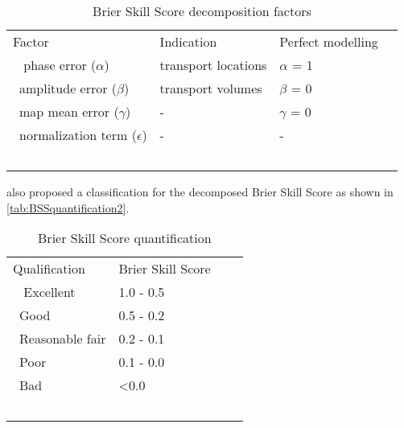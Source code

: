 \begin{table}[H]
  \centering
  \begin{table}[!tbp]
    \caption{Brier Skill Score decomposition factors \citep{Murphy1989}}
    \label{tab:BSSdecomposition}
    \begin{center}
      \begin{tabular}{llll}
        \hline\hline
        Factor & Indication & Perfect modelling\\\
        \hline
        phase error ($\alpha$) & transport locations & $\alpha$ = 1\\\
        amplitude error ($\beta$) & transport volumes & $\beta$ = 0\\\
        map mean error ($\gamma$) & - & $\gamma$ = 0\\\
        normalization term ($\epsilon$) & - & -\\\
        \hline
      \end{tabular}
    \end{center}
  \end{table}
\end{table}

\citet{VanRijn2003} also proposed a classification for the decomposed Brier Skill Score as shown in \autoref{tab:BSSquantification2}.

\begin{table}[H]
  \centering
  \begin{table}[!tbp]
    \caption{Brier Skill Score \citep{Murphy1989} quantification \citep{VanRijn2003}}
    \label{tab:BSSquantification2}
    \begin{center}
      \begin{tabular}{llll}
        \hline\hline
        Qualification & Brier Skill Score\\\
        \hline
        Excellent & 1.0 - 0.5\\\
        Good & 0.5 - 0.2\\\
        Reasonable fair & 0.2 - 0.1\\\
        Poor & 0.1 - 0.0\\\
        Bad & \textless 0.0\\\
        \hline
      \end{tabular}
    \end{center}
  \end{table}
\end{table}